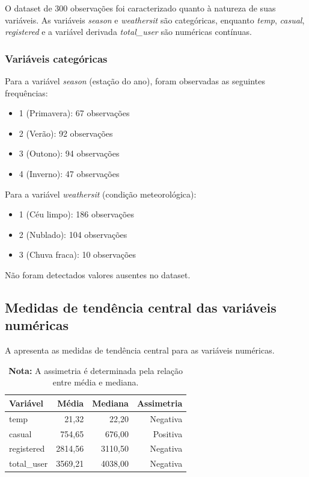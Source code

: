 \documentclass[12pt,a4paper]{article}
\begin{document}
O dataset de 300 observações foi caracterizado quanto à natureza de suas variáveis. As variáveis \textit{season} e \textit{weathersit} são categóricas, enquanto \textit{temp}, \textit{casual}, \textit{registered} e a variável derivada \textit{total\_user} são numéricas contínuas.

\subsubsection{Variáveis categóricas}

Para a variável \textit{season} (estação do ano), foram observadas as seguintes frequências:

\begin{itemize}
    \item 1 (Primavera): 67 observações
    \item 2 (Verão): 92 observações
    \item 3 (Outono): 94 observações
    \item 4 (Inverno): 47 observações
\end{itemize}

Para a variável \textit{weathersit} (condição meteorológica):

\begin{itemize}
    \item 1 (Céu limpo): 186 observações
    \item 2 (Nublado): 104 observações
    \item 3 (Chuva fraca): 10 observações
\end{itemize}

Não foram detectados valores ausentes no dataset.

\subsection{Medidas de tendência central das variáveis numéricas}

A  apresenta as medidas de tendência central para as variáveis numéricas.

\begin{table}[H]
    \centering
    \caption{Medidas de tendência central para variáveis numéricas.}
    \label{tab:tendencia_central}
    \begin{tabular}{lrrr}
        \toprule
        \textbf{Variável} & \textbf{Média} & \textbf{Mediana} & \textbf{Assimetria} \\
        \midrule
        temp & 21,32 & 22,20 & Negativa \\
        casual & 754,65 & 676,00 & Positiva \\
        registered & 2814,56 & 3110,50 & Negativa \\
        total\_user & 3569,21 & 4038,00 & Negativa \\
        \bottomrule
    \end{tabular}
    \vspace{2mm}
    \caption*{\small{\textbf{Nota:} A assimetria é determinada pela relação entre média e mediana.}}
\end{table}
\end{document}
